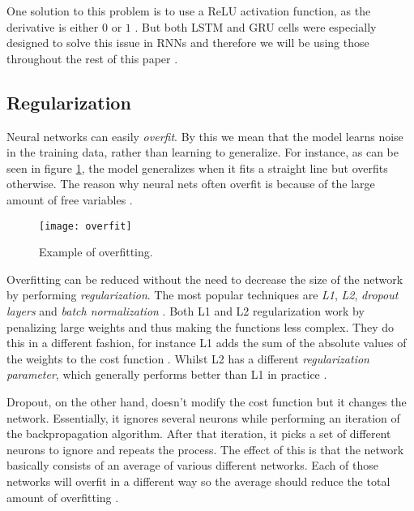 One solution to this problem is to use a ReLU activation function, as the derivative is either $0$ or $1$ \cite{britz_2016}.
But both LSTM and GRU cells were especially designed to solve this issue in RNNs and therefore we will be using those throughout the rest of this paper \cite{LSTM,hochreiter1997long,cho2014learning}.

\subsection{Regularization}

Neural networks can easily \textit{overfit}.
By this we mean that the model learns noise in the training data, rather than learning to generalize.
For instance, as can be seen in figure \ref{fig:overfit}, the model generalizes when it fits a straight line but overfits otherwise.
The reason why neural nets often overfit is because of the large amount of free variables \cite{nielsen_2017}.

\begin{figure}[ht]
  \centering
  \texttt{[image: overfit]}
  \caption{Example of overfitting.}
  \label{fig:overfit}
\end{figure}

\newpage

Overfitting can be reduced without the need to decrease the size of the network by performing \textit{regularization}.
The most popular techniques are \textit{L1}, \textit{L2}, \textit{dropout layers} and \textit{batch normalization} \cite{nielsen_2017}.
Both L1 and L2 regularization work by penalizing large weights and thus making the functions less complex.
They do this in a different fashion, for instance L1 adds the sum of the absolute values of the weights to the cost function \cite{nielsen_2017}.
Whilst L2 has a different \textit{regularization parameter}, which generally performs better than L1 in practice \cite{nielsen_2017}.

Dropout, on the other hand, doesn't modify the cost function but it changes the network.
Essentially, it ignores several neurons while performing an iteration of the backpropagation algorithm.
After that iteration, it picks a set of different neurons to ignore and repeats the process.
The effect of this is that the network basically consists of an average of various different networks.
Each of those networks will overfit in a different way so the average should reduce the total amount of overfitting \cite{nielsen_2017}.

